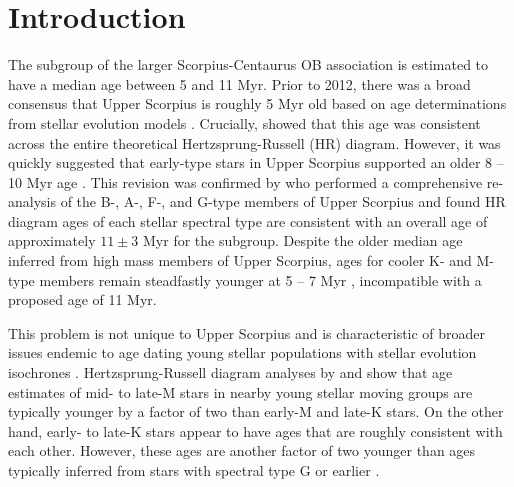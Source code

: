 \documentclass{aa}
\begin{document}

   \maketitle
%

\section{Introduction}
The  subgroup of the larger Scorpius-Centaurus OB association is estimated to have a median age between 5 and 11 Myr. Prior to 2012, there was a broad consensus that Upper Scorpius is roughly 5 Myr old based on age determinations from stellar evolution models \citep{deGeus1992, Preibisch2002, Slesnick2008}. Crucially, \citet{Preibisch2002} showed that this age was consistent across the entire theoretical Hertzsprung-Russell (HR) diagram. However, it was quickly suggested that early-type stars in Upper Scorpius supported an older 8 -- 10 Myr age \citep{Sartori2003}. This revision was confirmed by \citet{Pecaut2012} who performed a comprehensive re-analysis of the B-, A-, F-, and G-type members of Upper Scorpius and found HR diagram ages of each stellar spectral type are consistent with an overall age of approximately $11\pm3$ Myr for the subgroup. Despite the older median age inferred from high mass members of Upper Scorpius, ages for cooler K- and M-type members remain steadfastly younger at 5 -- 7 Myr \citep[][]{Herczeg2015, Rizzuto2015, Rizzuto2015b}, incompatible with a proposed age of 11 Myr.

This problem is not unique to Upper Scorpius and is characteristic of broader issues endemic to age dating young stellar populations with stellar evolution isochrones \citep[e.g.,][]{Naylor2009, Bell2012, Herczeg2015}. Hertzsprung-Russell diagram analyses by \citet{Malo2014} and \citet{Herczeg2015} show that age estimates of mid- to late-M stars in nearby young stellar moving groups are typically younger by a factor of two than early-M and late-K stars. On the other hand, early- to late-K stars appear to have ages that are roughly consistent with each other. However, these ages are another factor of two younger than ages typically inferred from stars with spectral type G or earlier \citep{Hillenbrand2008}. 
\end{document}
